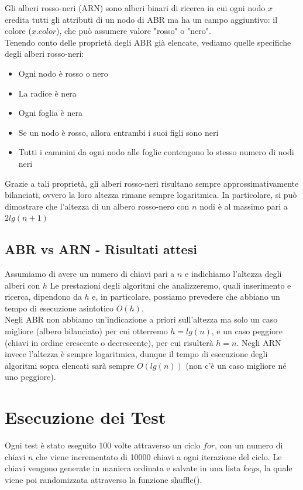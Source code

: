 \documentclass{article}
\begin{document}
Gli alberi rosso-neri (ARN) sono alberi binari di ricerca in cui ogni nodo $x$ eredita tutti gli attributi di un nodo di ABR ma ha un campo aggiuntivo: il colore ($x.color$), che può assumere valore "rosso" o "nero".\\
Tenendo conto delle proprietà degli ABR già elencate, vediamo quelle specifiche degli alberi rosso-neri:
\begin{itemize}
\item Ogni nodo è rosso o nero
\item La radice è nera
\item Ogni foglia è nera
\item Se un nodo è rosso, allora entrambi i suoi figli sono neri
\item Tutti i cammini da ogni nodo alle foglie contengono lo stesso numero di nodi neri
\end{itemize}
Grazie a tali proprietà, gli alberi rosso-neri risultano sempre approssimativamente bilanciati, ovvero la loro altezza rimane sempre logaritmica. In particolare, si può dimostrare che l'altezza di un albero rosso-nero con $n$ nodi è al massimo pari a $2lg(n+1)$

\subsection{ABR vs ARN - Risultati attesi}

Assumiamo di avere un numero di chiavi pari a $n$ e indichiamo l'altezza degli alberi con $h$
Le prestazioni degli algoritmi che analizzeremo, quali inserimento e ricerca, dipendono da $h$ e, in particolare, possiamo prevedere che abbiano un tempo di esecuzione asintotico $O(h)$.\\
Negli ABR non abbiamo un'indicazione a priori sull'altezza ma solo un caso migliore (albero bilanciato) per cui otterremo $h=lg(n)$, e un caso peggiore (chiavi in ordine crescente o decrescente), per cui risulterà $h=n$.
Negli ARN invece l'altezza è sempre logaritmica, dunque il tempo di esecuzione degli algoritmi sopra elencati sarà sempre $O(lg(n))$ (non c'è un caso migliore né uno peggiore).

\section{Esecuzione dei Test}

Ogni test è stato eseguito 100 volte attraverso un ciclo $for$, con un numero di chiavi $n$ che viene incrementato di 10000 chiavi a ogni iterazione del ciclo. Le chiavi vengono generate in maniera ordinata e salvate in una lista $keys$, la quale viene poi randomizzata attraverso la funzione shuffle().
\end{document}
